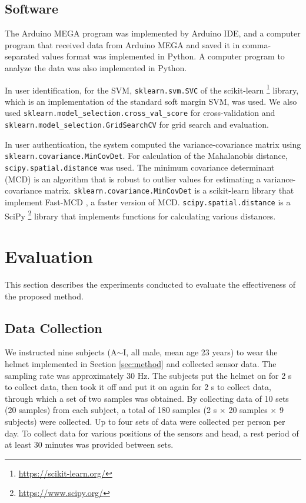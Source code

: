 \documentclass[english,preprint,JIP]{ipsj}
\begin{document}
\subsection{Software}
The Arduino MEGA program was implemented by Arduino IDE, and a computer program that received data from Arduino MEGA and saved it in comma-separated values format was implemented in Python. A computer program to analyze the data was also implemented in Python.\par

In user identification, for the SVM, \texttt{sklearn.svm.SVC} of the scikit-learn \footnote{\url{https://scikit-learn.org/}} library, which is an implementation of the standard soft margin SVM, was used. We also used \texttt{sklearn.model\_selection.cross\_val\_score} for cross-validation and \texttt{sklearn.model\_selection.GridSearchCV} for grid search and evaluation.\par

In user authentication, the system computed the variance-covariance matrix using \texttt{sklearn.covariance.MinCovDet}. For calculation of the Mahalanobis distance, \texttt{scipy.spatial.distance} was used. The minimum covariance determinant (MCD) is an algorithm that is robust to outlier values for estimating a variance-covariance matrix. \texttt{sklearn.covariance.MinCovDet} is a scikit-learn library that implement Fast-MCD \cite{fast_mcd}, a faster version of MCD. \texttt{scipy.spatial.distance} is a SciPy \footnote{\url{https://www.scipy.org/}} library that implements functions for calculating various distances.



\section{Evaluation}
\label{sec:evaluation}
This section describes the experiments conducted to evaluate the effectiveness of the proposed method.


\subsection{Data Collection}
We instructed nine subjects (A$\sim$I, all male, mean age 23 years) to wear the helmet implemented in Section \ref{sec:method} and collected sensor data. The sampling rate was approximately 30 Hz. The subjects put the helmet on for 2 s to collect data, then took it off and put it on again for 2 s to collect data, through which a set of two samples was obtained. By collecting data of 10 sets (20 samples) from each subject, a total of 180 samples (2 s $\times$ 20 samples $\times$ 9 subjects) were collected. Up to four sets of data were collected per person per day. To collect data for various positions of the sensors and head, a rest period of at least 30 minutes was provided between sets.
\end{document}
